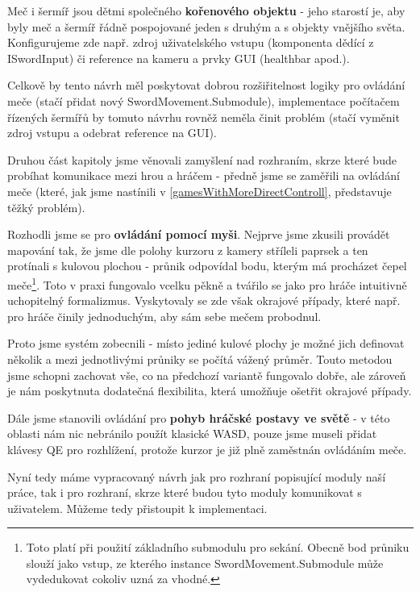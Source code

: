 Meč i šermíř jsou dětmi společného \textbf{kořenového objektu} - jeho starostí je, aby byly meč a šermíř řádně pospojované jeden s druhým a s objekty vnějšího světa. Konfigurujeme zde např. zdroj uživatelského vstupu (komponenta dědící z ISwordInput) či reference na kameru a prvky GUI (healthbar apod.).

Celkově by tento návrh měl poskytovat dobrou rozšiřitelnost logiky pro ovládání meče (stačí přidat nový SwordMovement.Submodule), implementace počítačem řízených šermířů by tomuto návrhu rovněž neměla činit problém (stačí vyměnit zdroj vstupu a odebrat reference na GUI).

\bigbreak

Druhou část kapitoly jsme věnovali zamyšlení nad rozhraním, skrze které bude probíhat komunikace mezi hrou a hráčem - předně jsme se zaměřili na ovládání meče (které, jak jsme nastínili v \ref{gamesWithMoreDirectControll}, představuje těžký problém).

Rozhodli jsme se pro \textbf{ovládání pomocí myši}. Nejprve jsme zkusili provádět mapování tak, že jsme dle polohy kurzoru z kamery stříleli paprsek a ten protínali s kulovou plochou - průnik odpovídal bodu, kterým má procházet čepel meče\footnote{Toto platí při použití základního submodulu pro sekání. Obecně bod průniku slouží jako vstup, ze kterého instance SwordMovement.Submodule může vydedukovat cokoliv uzná za vhodné.}. Toto v praxi fungovalo vcelku pěkně a tvářilo se jako pro hráče intuitivně uchopitelný formalizmus. Vyskytovaly se zde však okrajové případy, které např. pro hráče činily jednoduchým, aby sám sebe mečem probodnul.

Proto jsme systém zobecnili - místo jediné kulové plochy je možné jich definovat několik a mezi jednotlivými průniky se počítá vážený průměr. Touto metodou jsme schopni zachovat vše, co na předchozí variantě fungovalo dobře, ale zároveň je nám poskytnuta dodatečná flexibilita, která umožňuje ošetřit okrajové případy.

Dále jsme stanovili ovládání pro \textbf{pohyb hráčské postavy ve světě} - v této oblasti nám nic nebránilo použít klasické WASD, pouze jsme museli přidat klávesy QE pro rozhlížení, protože kurzor je již plně zaměstnán ovládáním meče.

\bigbreak
Nyní tedy máme vypracovaný návrh jak pro rozhraní popisující moduly naší práce, tak i pro rozhraní, skrze které budou tyto moduly komunikovat s uživatelem. Můžeme tedy přistoupit k implementaci.
